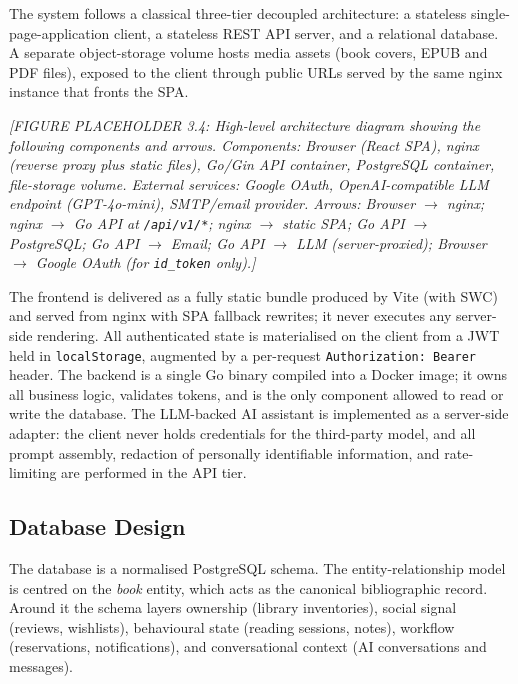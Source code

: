 \documentclass[12pt,a4paper]{report}
\begin{document}
The system follows a classical three-tier decoupled architecture: a
stateless single-page-application client, a stateless REST API server,
and a relational database. A separate object-storage volume hosts media
assets (book covers, EPUB and PDF files), exposed to the client through
public URLs served by the same nginx instance that fronts the SPA.

\textit{[FIGURE PLACEHOLDER 3.4: High-level architecture diagram showing
the following components and arrows. Components: Browser (React SPA),
nginx (reverse proxy plus static files), Go/Gin API container,
PostgreSQL container, file-storage volume. External services: Google
OAuth, OpenAI-compatible LLM endpoint (GPT-4o-mini), SMTP/email provider.
Arrows: Browser $\to$ nginx; nginx $\to$ Go API at \texttt{/api/v1/*};
nginx $\to$ static SPA; Go API $\to$ PostgreSQL; Go API $\to$ Email; Go
API $\to$ LLM (server-proxied); Browser $\to$ Google OAuth (for
\texttt{id\_token} only).]}

The frontend is delivered as a fully static bundle produced by Vite (with
SWC) and served from nginx with SPA fallback rewrites; it never executes
any server-side rendering. All authenticated state is materialised on the
client from a JWT held in \texttt{localStorage}, augmented by a
per-request \texttt{Authorization: Bearer} header. The backend is a
single Go binary compiled into a Docker image; it owns all business
logic, validates tokens, and is the only component allowed to read or
write the database. The LLM-backed AI assistant is implemented as a
server-side adapter: the client never holds credentials for the
third-party model, and all prompt assembly, redaction of personally
identifiable information, and rate-limiting are performed in the API tier.

\subsection{Database Design}

The database is a normalised PostgreSQL schema. The entity-relationship
model is centred on the \textit{book} entity, which acts as the canonical
bibliographic record. Around it the schema layers ownership (library
inventories), social signal (reviews, wishlists), behavioural state
(reading sessions, notes), workflow (reservations, notifications), and
conversational context (AI conversations and messages).
\end{document}

